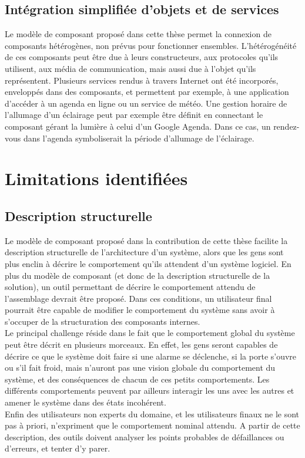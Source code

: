 \subsection{Intégration simplifiée d'objets et de services}
Le modèle de composant proposé dans cette thèse permet la connexion de composants hétérogènes, non prévus pour fonctionner ensembles. L'hétérogénéité de ces composants peut être due à leurs constructeurs, aux protocoles qu'ils utilisent, aux média de communication, mais aussi due à l'objet qu'ils représentent. Plusieurs services rendus à travers Internet ont été incorporés, enveloppés dans des composants, et permettent par exemple, à une application d'accéder à un agenda en ligne ou un service de météo. Une gestion horaire de l'allumage d'un éclairage peut par exemple \^etre définit en connectant le composant gérant la lumière à celui d'un Google Agenda. Dans ce cas, un rendez-vous dans l'agenda symboliserait la période d'allumage de l'éclairage.


\section{Limitations identifiées}

\subsection{Description structurelle}

Le modèle de composant proposé dans la contribution de cette thèse facilite la description structurelle de l'architecture d'un système, alors que les gens sont plus enclin à décrire le comportement qu'ils attendent d'un système logiciel. En plus du modèle de composant (et donc de la description structurelle de la solution), un outil permettant de décrire le comportement attendu de l'assemblage devrait être proposé. Dans ces conditions, un utilisateur final pourrait être capable de modifier le comportement du système sans avoir à s'occuper de la structuration des composants internes.\\
Le principal challenge réside dans le fait que le comportement global du système peut être décrit en plusieurs morceaux. En effet, les gens seront capables de décrire ce que le système doit faire si une alarme se déclenche, si la porte s'ouvre ou s'il fait froid, mais n'auront pas une vision globale du comportement du système, et des conséquences de chacun de ces petits comportements. Les différents comportements peuvent par ailleurs interagir les uns avec les autres et amener le système dans des états incohérent.\\
Enfin des utilisateurs non experts du domaine, et les utilisateurs finaux ne le sont pas à priori, n'expriment que le comportement nominal attendu. A partir de cette description, des outils doivent analyser les points probables de défaillances ou d'erreurs, et tenter d'y parer.


